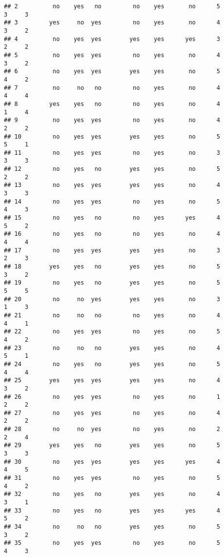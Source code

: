 \documentclass[]{article}
\begin{document}
\begin{verbatim}
## 2          no    yes   no         no    yes       no      5        3     3
## 3         yes     no  yes         no    yes       no      4        3     2
## 4          no    yes  yes        yes    yes      yes      3        2     2
## 5          no    yes  yes         no    yes       no      4        3     2
## 6          no    yes  yes        yes    yes       no      5        4     2
## 7          no     no   no         no    yes       no      4        4     4
## 8         yes    yes   no         no    yes       no      4        1     4
## 9          no    yes  yes         no    yes       no      4        2     2
## 10         no    yes  yes        yes    yes       no      5        5     1
## 11         no    yes  yes         no    yes       no      3        3     3
## 12         no    yes   no        yes    yes       no      5        2     2
## 13         no    yes  yes        yes    yes       no      4        3     3
## 14         no    yes  yes         no    yes       no      5        4     3
## 15         no    yes   no         no    yes      yes      4        5     2
## 16         no    yes   no         no    yes       no      4        4     4
## 17         no    yes  yes        yes    yes       no      3        2     3
## 18        yes    yes   no        yes    yes       no      5        3     2
## 19         no    yes   no        yes    yes       no      5        5     5
## 20         no     no  yes        yes    yes       no      3        1     3
## 21         no     no   no         no    yes       no      4        4     1
## 22         no    yes  yes         no    yes       no      5        4     2
## 23         no     no   no        yes    yes       no      4        5     1
## 24         no    yes   no        yes    yes       no      5        4     4
## 25        yes    yes  yes        yes    yes       no      4        3     2
## 26         no    yes  yes         no    yes       no      1        2     2
## 27         no    yes  yes         no    yes       no      4        2     2
## 28         no     no  yes         no    yes       no      2        2     4
## 29        yes    yes   no        yes    yes       no      5        3     3
## 30         no    yes  yes        yes    yes      yes      4        4     5
## 31         no    yes  yes         no    yes       no      5        4     2
## 32         no    yes   no        yes    yes       no      4        3     1
## 33         no    yes   no        yes    yes      yes      4        5     2
## 34         no     no   no        yes    yes       no      5        3     2
## 35         no    yes  yes         no    yes       no      5        4     3

\end{verbatim}
\end{document}
